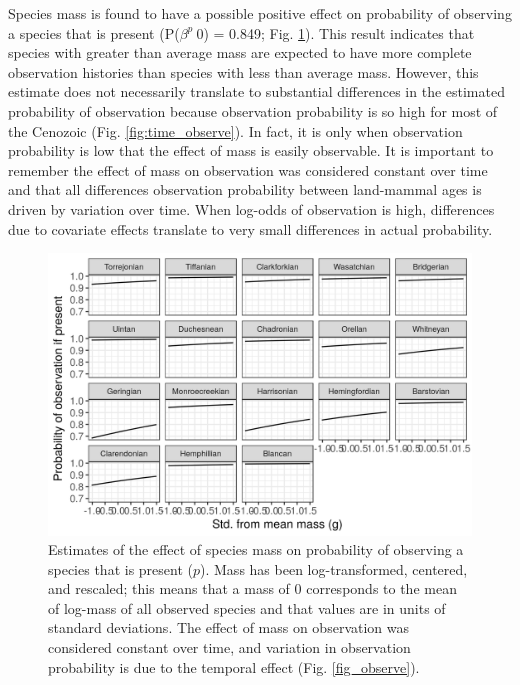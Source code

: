 \documentclass[12pt,letterpaper]{article}
\begin{document}
Species mass is found to have a possible positive effect on probability of observing a species that is present (P(\(\beta^{p} \> 0\)) = 0.849; Fig. \ref{fig:mass_observe}). This result indicates that species with greater than average mass are expected to have more complete observation histories than species with less than average mass. However, this estimate does not necessarily translate to substantial differences in the estimated probability of observation because observation probability is so high for most of the Cenozoic (Fig. \ref{fig:time_observe}). In fact, it is only when observation probability is low that the effect of mass is easily observable. It is important to remember the effect of mass on observation was considered constant over time and that all differences observation probability between land-mammal ages is driven by variation over time. When log-odds of observation is high, differences due to covariate effects translate to very small differences in actual probability. %
\begin{figure}[ht]
  \centering
  \includegraphics[width=\textwidth,height=0.4\textheight,keepaspectratio=true]{figure/mass_on_pres_bd}
  \caption[Estimates of the effect of mass on observation probability]{Estimates of the effect of species mass on probability of observing a species that is present (\(p\)). Mass has been log-transformed, centered, and rescaled; this means that a mass of 0 corresponds to the mean of log-mass of all observed species and that values are in units of standard deviations. The effect of mass on observation was considered constant over time, and variation in observation probability is due to the temporal effect (Fig. \ref{fig_observe}).} 
  \label{fig:mass_observe}
\end{figure}
\end{document}
